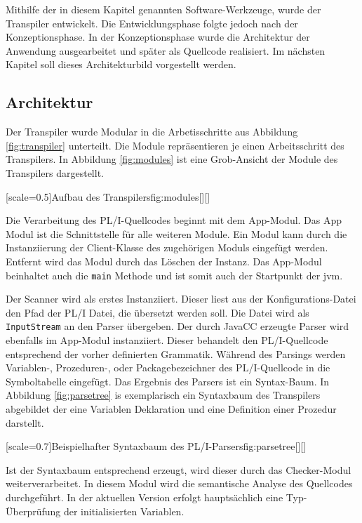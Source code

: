 Mithilfe der in diesem Kapitel genannten Software-Werkzeuge, wurde der Transpiler entwickelt. Die Entwicklungsphase folgte jedoch nach der Konzeptionsphase.
In der Konzeptionsphase wurde die Architektur der Anwendung ausgearbeitet und später als Quellcode realisiert. 
Im nächsten Kapitel soll dieses Architekturbild vorgestellt werden.

\pagebreak
\subsection{Architektur} 

Der Transpiler wurde Modular in die Arbetisschritte aus Abbildung \ref{fig:transpiler} unterteilt.
Die Module repräsentieren je einen Arbeitsschritt des Transpilers.
In Abbildung \ref{fig:modules} ist eine Grob-Ansicht der Module des Transpilers dargestellt.

[scale=0.5]{Aufbau des Transpilers}{fig:modules}[][]

Die Verarbeitung des PL/I-Quellcodes beginnt mit dem App-Modul. Das App Modul ist die Schnittstelle für alle weiteren Module. Ein Modul kann durch die Instanziierung der Client-Klasse des zugehörigen Moduls eingefügt werden. Entfernt wird das Modul durch das Löschen der Instanz. Das App-Modul beinhaltet auch die \verb+main+ Methode und ist somit auch der Startpunkt der \ac{jvm}.

Der Scanner wird als erstes Instanziiert. Dieser liest aus der Konfigurations-Datei den Pfad der PL/I Datei, die übersetzt werden soll. Die Datei wird als \verb+InputStream+ an den Parser übergeben.
\pagebreak
Der durch JavaCC erzeugte Parser wird ebenfalls im App-Modul instanziiert. Dieser behandelt den PL/I-Quellcode entsprechend der vorher definierten Grammatik.  Während des Parsings werden Variablen-, Prozeduren-, oder Packagebezeichner des PL/I-Quellcode in die Symboltabelle eingefügt. Das Ergebnis des Parsers ist ein Syntax-Baum. 
In Abbildung \ref{fig:parsetree} is exemplarisch ein Syntaxbaum des Transpilers abgebildet der eine Variablen Deklaration und eine Definition einer Prozedur darstellt.

[scale=0.7]{Beispielhafter Syntaxbaum des PL/I-Parsers}{fig:parsetree}[][]

Ist der Syntaxbaum entsprechend erzeugt, wird dieser durch das Checker-Modul weiterverarbeitet. In diesem Modul wird die semantische Analyse des Quellcodes durchgeführt. In der aktuellen Version erfolgt hauptsächlich eine Typ-Überprüfung der initialisierten Variablen.

